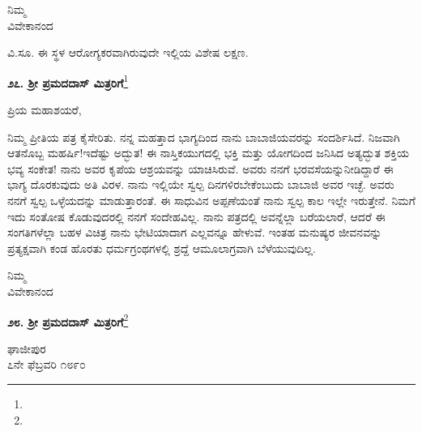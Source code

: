 \vspace{-0.5cm}

{\flushright
ನಿಮ್ಮ\\ವಿವೇಕಾನಂದ\par}

ವಿ.ಸೂ. \enginline{-}ಈ ಸ್ಥಳ ಆರೋಗ್ಯಕರವಾಗಿರುವುದೇ ಇಲ್ಲಿಯ ವಿಶೇಷ ಲಕ್ಷಣ.

\vspace{-0.2cm}

\begin{center}
\textbf{೨೭. ಶ‍್ರೀ ಪ್ರಮದದಾಸ್ ಮಿತ್ರರಿಗೆ}\footnote{}
\end{center}

\vspace{-0.55cm}

\begin{flushright}
{\fontsize{11pt}{10pt}\selectfont{ಘಾಜೀಪುರ\\[-2pt] ೪ನೇ ಫೆಬ್ರವರಿ ೧೮೯೦}}
\end{flushright}
\vspace{-0.5cm}

\noindent
ಪ್ರಿಯ ಮಹಾಶಯರೆ,

ನಿಮ್ಮ ಪ್ರೀತಿಯ ಪತ್ರ ಕೈಸೇರಿತು. ನನ್ನ ಮಹತ್ತಾದ ಭಾಗ್ಯದಿಂದ ನಾನು ಬಾಬಾಜಿಯವರನ್ನು ಸಂದರ್ಶಿಸಿದೆ. ನಿಜವಾಗಿ ಆತನೊಬ್ಬ ಮಹರ್ಷಿ!ಇದೆಷ್ಟು ಅದ್ಭುತ! ಈ ನಾಸ್ತಿಕಯುಗದಲ್ಲಿ ಭಕ್ತಿ ಮತ್ತು ಯೋಗದಿಂದ ಜನಿಸಿದ ಅತ್ಯದ್ಭುತ ಶಕ್ತಿಯ ಭವ್ಯ ಸಂಕೇತ! ನಾನು ಅವರ ಕೃಪೆಯ ಆಶ್ರಯವನ್ನು ಯಾಚಿಸಿರುವೆ. ಅವರು ನನಗೆ ಭರವಸೆಯನ್ನು\break ನೀಡಿದ್ದಾರೆ\enginline{-} ಈ ಭಾಗ್ಯ ದೊರಕುವುದು ಅತಿ ವಿರಳ. ನಾನು ಇಲ್ಲಿಯೇ ಸ್ವಲ್ಪ ದಿನಗಳಿರಬೇಕೆಂಬುದು ಬಾಬಾಜಿ ಅವರ ಇಚ್ಛೆ. ಅವರು ನನಗೆ ಸ್ವಲ್ಪ ಒಳ್ಳೆಯದನ್ನು ಮಾಡುತ್ತಾರಂತೆ. ಈ ಸಾಧುವಿನ ಅಪ್ಪಣೆಯಂತೆ ನಾನು ಸ್ವಲ್ಪ ಕಾಲ ಇಲ್ಲೇ ಇರುತ್ತೇನೆ. ನಿಮಗೆ ಇದು ಸಂತೋಷ ಕೊಡುವುದರಲ್ಲಿ ನನಗೆ ಸಂದೇಹವಿಲ್ಲ. ನಾನು ಪತ್ರದಲ್ಲಿ ಅವನ್ನೆಲ್ಲಾ ಬರೆಯಲಾರೆ, ಆದರೆ ಈ ಸಂಗತಿಗಳೆಲ್ಲಾ ಬಹಳ ವಿಚಿತ್ರ \enginline{-} ನಾನು ಭೇಟಿಯಾದಾಗ ಎಲ್ಲವನ್ನೂ ಹೇಳುವೆ. ಇಂತಹ ಮನುಷ್ಯರ ಜೀವನವನ್ನು ಪ್ರತ್ಯಕ್ಷವಾಗಿ ಕಂಡ ಹೊರತು ಧರ್ಮಗ್ರಂಥಗಳಲ್ಲಿ ಶ್ರದ್ದೆ ಆಮೂಲಾಗ್ರವಾಗಿ ಬೆಳೆಯುವುದಿಲ್ಲ.

\vspace{-0.5cm}

{\flushright
ನಿಮ್ಮ\\ವಿವೇಕಾನಂದ\par}

\begin{center}
\textbf{೨೮. ಶ‍್ರೀ ಪ್ರಮದದಾಸ್ ಮಿತ್ರರಿಗೆ}\footnote{}
\end{center}
\vspace{-0.5cm}

\begin{flushright}
ಘಾಜೀಪುರ\\೭ನೇ ಫೆಬ್ರವರಿ ೧೮೯೦
\end{flushright}
\vspace{-0.5cm}

